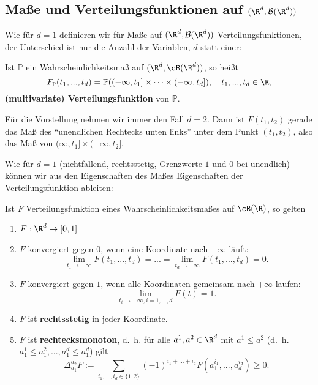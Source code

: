 \subsection*{Maße und Verteilungsfunktionen auf $(\R^d, \mathcal B(\R^d))$}
Wie f\"ur $d=1$ definieren wir f\"ur Ma\ss e auf $(\R^d, \mathcal B(\R^d))$ Verteilungsfunktionen, der Unterschied ist nur die Anzahl der Variablen, $d$ statt einer:
\begin{deff}
	Ist $\mathbb{P}$ ein Wahrscheinlichkeitsmaß auf $ (\R^d,\cB(\R^d)) $, so heißt $$F_{\mathbb{P}}(t_1,...,t_d) = \mathbb{P}((-\infty, t_1] \times \dots \times (-\infty, t_d]),\quad t_1,...,t_d\in\R,$$ \textbf{(multivariate) Verteilungsfunktion} von $\mathbb{P}$.
\end{deff}
F\"ur die Vorstellung nehmen wir immer den Fall $d=2$. Dann ist $F(t_1,t_2)$ gerade das Ma\ss{} des \enquote{unendlichen Rechtecks unten links} unter dem Punkt $(t_1,t_2)$, also das Ma\ss{} von $(\infty, t_1]\times (-\infty,t_2].$\smallskip

Wie f\"ur $d=1$ (nichtfallend, rechtsstetig, Grenzwerte $1$ und $0$ bei unendlich) k\"onnen wir aus den Eigenschaften des Ma\ss es Eigenschaften der Verteilungsfunktion ableiten:
\begin{prop}\label{p9}
	Ist $F$ Verteilungsfunktion eines Wahrscheinlichkeitsmaßes auf $\cB(\R)$, so gelten
	\begin{enumerate}[label=(\roman*)]
	\item $F:\R^d\to [0,1]$
	\item $F$ konvergiert gegen $0$, wenn eine Koordinate nach $-\infty$ l\"auft:
	\[ \lim\limits_{t_1 \to -\infty} F(t_1,...,t_d) = ... = \lim\limits_{t_d \to -\infty} F(t_1,...,t_d) = 0. \]
	\item $F$ konvergiert gegen $1$, wenn alle Koordinaten gemeinsam nach $+\infty$ laufen: 
	 \[ \lim\limits_{t_i \to -\infty, i=1,...,d} F(t) = 1. \]
	\item $F$ ist \textbf{rechtsstetig} in jeder Koordinate.
	\item $F$ ist \textbf{rechtecksmonoton}, \mbox{d. h.} für alle $a^1, a^2\in \R^d$ mit $a^1 \leq a^2$ (\mbox{d. h.} $a_1^1 \leq a_1^2,..., a_1^d \leq a_1^d$) gilt \[ \Delta_{a_1}^{a_2}F := \sum\limits_{i_1,...,i_d \in \{ 1,2 \}} (-1)^{i_1+...+i_d} F(a_1^{i_1},...,a_d^{i_d}) \geq 0. \]
	\end{enumerate}
\end{prop}


